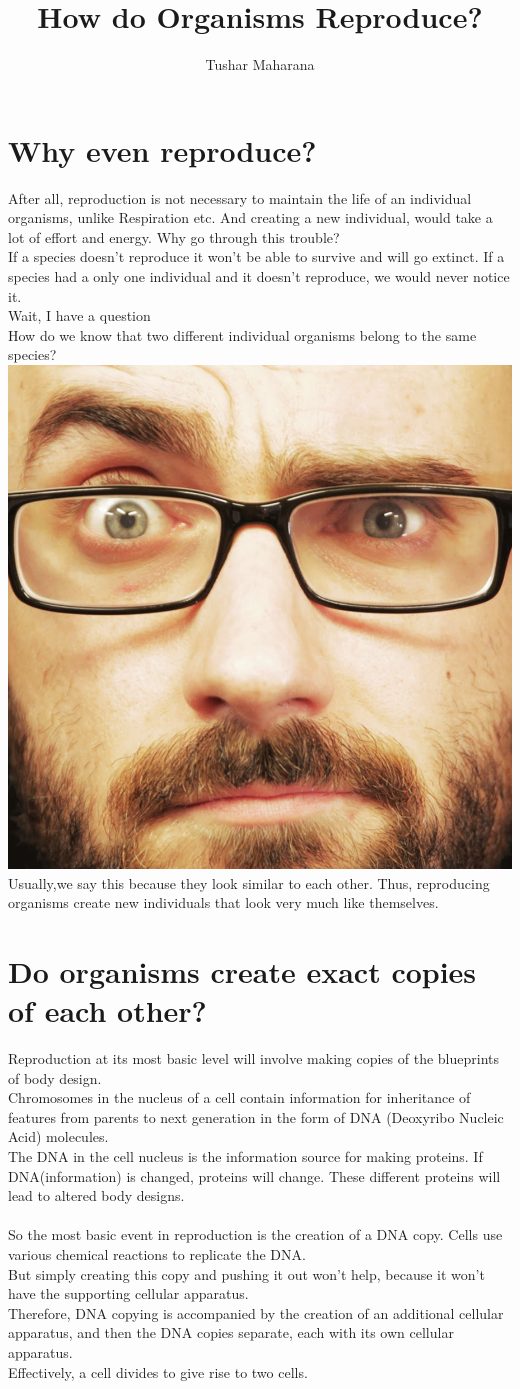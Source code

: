 \documentclass[A4]{article}
\title{How do Organisms Reproduce?}
\author{Tushar Maharana}
\newcommand{\vsauce}{\includegraphics[scale=0.015]{vsauce-eyes.jpg}}
\begin{document}
    \maketitle
    \tableofcontents
    \section{Why even reproduce?}
    After all, reproduction is not necessary to maintain the life of an individual organisms, unlike Respiration etc.
    And creating a new individual, would take a lot of effort and energy. Why go through this trouble?
    \\
    If a species doesn't reproduce it won't be able to survive and will go extinct. If a species had a only one individual and it doesn't reproduce, we would never notice it.
    \\ Wait, I have a question \\
    How do we know that two different individual organisms belong to the same species?
    \vsauce \\
    Usually,we say this because they look similar to each other.
    Thus, reproducing organisms create new individuals that look very much like themselves.
    \section{Do organisms create exact copies of each other?}
    Reproduction at its most basic level will involve making copies of the blueprints of body design. \\
    Chromosomes in the nucleus of a cell contain information for inheritance of features from parents to next generation in the form of DNA (Deoxyribo Nucleic Acid) molecules.\\
    The DNA in the cell nucleus is the information source for making proteins. If DNA(information) is changed, proteins will change. These different proteins will lead to altered body designs.\\
    \paragraph{}
    So the most basic event in reproduction is the creation of a DNA copy. Cells use various chemical reactions to replicate the DNA.\\
    But simply creating this copy and pushing it out won't help, because it won't have the supporting cellular apparatus. \\
    Therefore, DNA copying is accompanied by the creation of an additional cellular apparatus, and then the DNA copies separate, each with its own cellular apparatus. \\
    Effectively, a cell divides to give rise to two cells.
\end{document}
